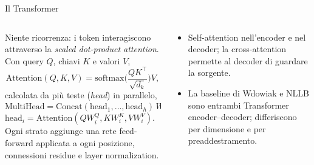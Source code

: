 \documentclass[aspectratio=169]{beamer}
\newcommand{\T}[2]{#2}
\newcommand{\T}[2]{#1}
\begin{document}
\begin{frame}{\T{The Transformer}{Il Transformer}}
  \begin{columns}[t]
    \begin{column}{0.58\textwidth}
      \small
      \T{No recurrence: tokens interact through scaled dot-product attention. With queries
      $Q$, keys $K$ and values $V$,}%
      {Niente ricorrenza: i token interagiscono attraverso la \emph{scaled dot-product attention}.
      Con query $Q$, chiavi $K$ e valori $V$,}
      \[
        \mathrm{Attention}(Q,K,V)=\mathrm{softmax}\!\Big(\frac{QK^{\!\top}}{\sqrt{d_k}}\Big)V,
      \]
      \T{computed in parallel heads,}{calcolata da pi\`u teste (\emph{head}) in parallelo,}
      \[
        \mathrm{MultiHead}=\mathrm{Concat}(\mathrm{head}_1,\dots,\mathrm{head}_h)\,W^{O},
      \]
      $\mathrm{head}_i=\mathrm{Attention}(QW_i^Q,KW_i^K,VW_i^V)$. \T{Each layer adds a
      position-wise FFN, residual connections and layer normalization.}%
      {Ogni strato aggiunge una rete feed-forward applicata a ogni posizione, connessioni residue e layer normalization.}
    \end{column}
    \begin{column}{0.42\textwidth}
      \small
      \begin{itemize}
        \item \T{Self-attention in the encoder and in the decoder; cross-attention lets the
              decoder look at the source.}%
              {Self-attention nell'encoder e nel decoder; la cross-attention permette al
              decoder di guardare la sorgente.}
        \item \T{Wdowiak's baseline and NLLB are both encoder--decoder Transformers; they differ
              in size and in pretraining.}%
              {La baseline di Wdowiak e NLLB sono entrambi Transformer encoder--decoder;
              differiscono per dimensione e per preaddestramento.}
      \end{itemize}
    \end{column}
  \end{columns}
\end{frame}
\end{document}
